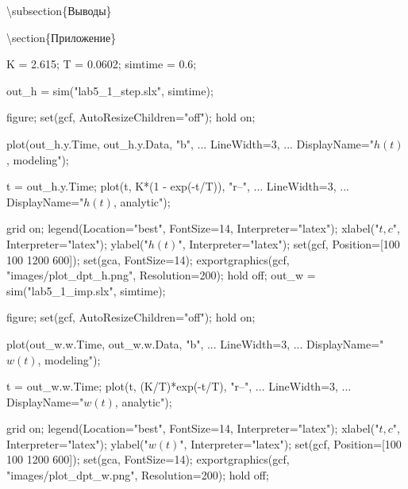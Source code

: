 \textbackslash{}subsection\{Выводы\}



\textbackslash{}section\{Приложение\}


\begin{matlabcode}
K = 2.615;
T = 0.0602;
simtime = 0.6;

out_h = sim("lab5_1_step.slx", simtime);

figure;
set(gcf, AutoResizeChildren="off");
hold on;

plot(out_h.y.Time, out_h.y.Data, "b", ...
     LineWidth=3, ...
     DisplayName="$h(t)$, modeling");

t = out_h.y.Time;
plot(t, K*(1 - exp(-t/T)), "r--", ...
     LineWidth=3, ...
     DisplayName="$h(t)$, analytic");

grid on;
legend(Location="best", FontSize=14, Interpreter="latex");
xlabel("$t, c$", Interpreter="latex");
ylabel("$h(t)$", Interpreter="latex");
set(gcf, Position=[100 100 1200 600]);
set(gca, FontSize=14);
exportgraphics(gcf, "images/plot_dpt_h.png", Resolution=200);
hold off;
out_w = sim("lab5_1_imp.slx", simtime);

figure;
set(gcf, AutoResizeChildren="off");
hold on;

plot(out_w.w.Time, out_w.w.Data, "b", ...
     LineWidth=3, ...
     DisplayName="$w(t)$, modeling");

t = out_w.w.Time;
plot(t, (K/T)*exp(-t/T), "r--", ...
     LineWidth=3, ...
     DisplayName="$w(t)$, analytic");

grid on;
legend(Location="best", FontSize=14, Interpreter="latex");
xlabel("$t, c$", Interpreter="latex");
ylabel("$w(t)$", Interpreter="latex");
set(gcf, Position=[100 100 1200 600]);
set(gca, FontSize=14);
exportgraphics(gcf, "images/plot_dpt_w.png", Resolution=200);
hold off;
\end{matlabcode}



